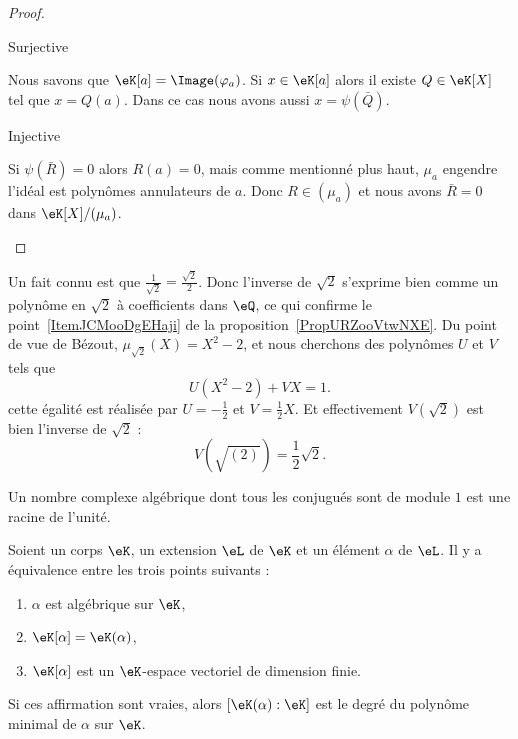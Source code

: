 \begin{proof}
\begin{enumerate}
\begin{subproof}
            \item[Surjective]

                Nous savons que \( \eK[a]=\Image(\varphi_a)\). Si \( x\in \eK[a]\) alors il existe \( Q\in \eK[X]\) tel que \( x=Q(a)\). Dans ce cas nous avons aussi \( x=\psi(\bar Q)\).

            \item[Injective]

                Si \( \psi(\bar R)=0\) alors \( R(a)=0\), mais comme mentionné plus haut, \( \mu_a\) engendre l'idéal est polynômes annulateurs de \( a\). Donc \( R\in (\mu_a)\) et nous avons \( \bar R=0\) dans \( \eK[X]/(\mu_a)\).

            \end{subproof}

    \end{enumerate}
\end{proof}

\begin{example}
    Un fait connu est que \( \frac{1}{ \sqrt{2} }=\frac{ \sqrt{2} }{ 2 }\). Donc l'inverse de \( \sqrt{2}\) s'exprime bien comme un polynôme en \( \sqrt{2}\) à coefficients dans \( \eQ\), ce qui confirme le point~\ref{ItemJCMooDgEHaji} de la proposition~\ref{PropURZooVtwNXE}. Du point de vue de Bézout, \( \mu_{\sqrt{2}}(X)=X^2-2\), et nous cherchons des polynômes \( U\) et \( V\) tels que
    \begin{equation}
        U(X^2-2)+VX=1.
    \end{equation}
    cette égalité est réalisée par \( U=-\frac{ 1 }{2}\) et \( V=\frac{ 1 }{2}X\). Et effectivement \( V(\sqrt{2})\) est bien l'inverse de \( \sqrt{2}\) :
    \begin{equation}
        V(\sqrt{(2)})=\frac{ 1 }{2}\sqrt{2}.
    \end{equation}
\end{example}

\begin{lemma}
    Un nombre complexe algébrique dont tous les conjugués sont de module \( 1\) est une racine de l'unité.
\end{lemma}

\begin{proposition}
    Soient un corps \( \eK\), un extension \( \eL\) de \( \eK\) et un élément \( \alpha\) de \( \eL\). Il y a équivalence entre les trois points suivants :
    \begin{enumerate}
        \item   \label{ITEMooYTEBooUuEfBz}
            \( \alpha\) est algébrique sur \( \eK\),
        \item   \label{ITEMooWMQTooLnepQl}
            \( \eK[\alpha]=\eK(\alpha)\),
        \item   \label{ITEMooAQIUooMVZojp}
            \( \eK[\alpha]\) est un \( \eK\)-espace vectoriel de dimension finie.
    \end{enumerate}
    Si ces affirmation sont vraies, alors \( [\eK(\alpha):\eK]\) est le degré du polynôme minimal de \( \alpha\) sur \( \eK\).
\end{proposition}

